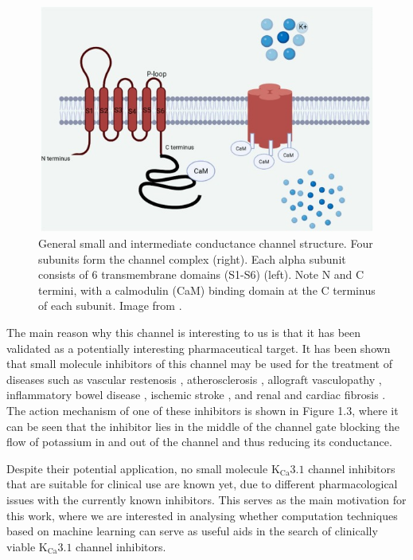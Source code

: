 \begin{figure}[h]
\includegraphics[width=12cm, height=7.5cm]{Images/Introduction/SK_Channel_schema.jpg}
\centering
\caption{General small and intermediate conductance channel structure. Four subunits form the channel complex (right). Each alpha subunit consists of 6 transmembrane domains (S1-S6) (left). Note N and C termini, with a calmodulin (CaM) binding domain at the C terminus of each subunit. Image from \cite{sk4_schema}.}
\label{fig:Figure 3.1}
\end{figure}

The main reason why this channel is interesting to us is that it has been validated as a potentially interesting pharmaceutical target. It has been shown that small molecule inhibitors of this channel may be used for the treatment of diseases such as vascular restenosis \cite{vascular_restenosis}, atherosclerosis \cite{atherosclerosis}, allograft vasculopathy \cite{allograft_vasculopathy}, inflammatory bowel disease \cite{inflammatory_bowel_disease}, ischemic stroke \cite{ischemic_stroke}, and renal \cite{renal_fibrosis} and cardiac fibrosis \cite{cardiac_fibrosis}. The action mechanism of one of these inhibitors is shown in Figure 1.3, where it can be seen that the inhibitor lies in the middle of the channel gate blocking the flow of potassium in and out of the channel and thus reducing its conductance.

Despite their potential application, no small molecule $\text{K}_{\text{Ca}}3.1$ channel inhibitors that are suitable for clinical use are known yet, due to different pharmacological issues with the currently known inhibitors. This serves as the main motivation for this work, where we are interested in analysing whether computation techniques based on machine learning can serve as useful aids in the search of clinically viable $\text{K}_{\text{Ca}}3.1$ channel inhibitors.

